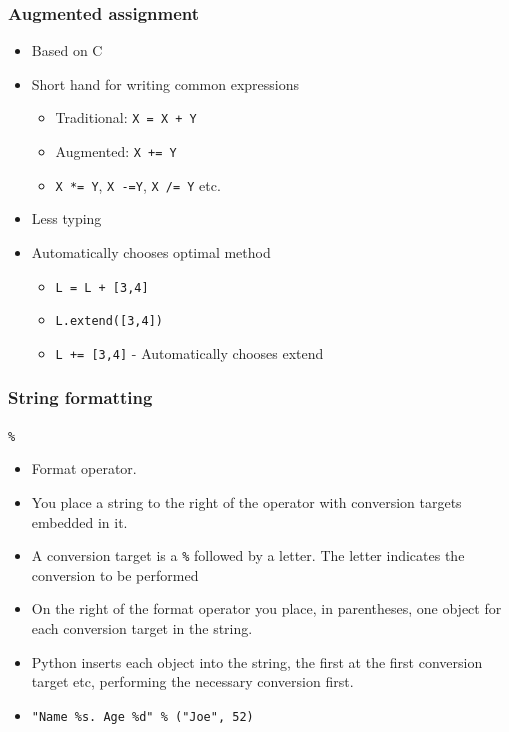 \documentclass{beamer}
\begin{document}
\begin{frame}
\frametitle{Augmented assignment}
\begin{itemize}
\item Based on C
\item Short hand for writing common expressions
\begin{itemize}
\item Traditional: \texttt{X = X + Y}
\item Augmented: \texttt{X += Y}
\item \texttt{X *= Y}, \texttt{X -=Y}, \texttt{X /= Y} etc.
\end{itemize}
\item Less typing
\item Automatically chooses optimal method
\begin{itemize}
\item \texttt{L = L + [3,4]}
\item \texttt{L.extend([3,4])}
\item \texttt{L += [3,4]} - Automatically chooses extend
\end{itemize}
\end{itemize}
\end{frame}

\begin{frame}
\frametitle{String formatting}
\texttt{\%}
\begin{itemize}
\item Format operator.
\item You place a string to the right of the operator with conversion targets embedded in it.
\item A conversion target is a \texttt{\%} followed by a letter. The letter indicates the conversion to be performed
\item On the right of the format operator you place, in parentheses, one object for each conversion target in the string.
\item Python inserts each object into the string, the first at the first conversion target etc, performing the necessary conversion first.
\item \texttt{"Name \%s. Age \%d" \% ("Joe", 52)}
\end{itemize}
\end{frame}
\end{document}
